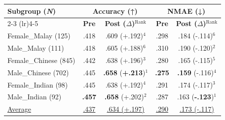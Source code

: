 \begin{tabular}{@{} p{2.8cm} | c c | c c @{}}
\toprule
\multirow{2}{*}{\textbf{Subgroup (\textbf{\textit{N}})}} & \multicolumn{2}{c|}{\textbf{Accuracy (↑)}} & \multicolumn{2}{c}{\textbf{NMAE (↓)}} \\
\cmidrule(lr){2-3} \cmidrule(lr){4-5}
& \textbf{Pre} & \textbf{Post ($\Delta$)}$^{\text{Rank}}$ & \textbf{Pre} & \textbf{Post ($\Delta$)}$^{\text{Rank}}$ \\
\midrule
Female\_Malay (125) & .418 & .609 (+.192)$^{4}$ & .298 & .184 (-.114)$^{6}$ \\
Male\_Malay (111) & .418 & .605 (+.188)$^{6}$ & .310 & .190 (-.120)$^{2}$ \\
Female\_Chinese (845) & .442 & .638 (+.196)$^{3}$ & .280 & .165 (-.115)$^{5}$ \\
Male\_Chinese (702) & .445 & \textbf{.658} (\textbf{+.213})$^{1}$ & \textbf{.275} & \textbf{.159} (-.116)$^{4}$ \\
Female\_Indian (98) & .445 & .638 (+.192)$^{4}$ & .291 & .174 (-.117)$^{3}$ \\
Male\_Indian (92) & \textbf{.457} & \textbf{.658} (+.202)$^{2}$ & .287 & .163 (\textbf{-.123})$^{1}$ \\
\midrule
\underline{Average} & \underline{.437} & \underline{.634 (+.197)} & \underline{.290} & \underline{.173 (-.117)} \\
\bottomrule
\end{tabular}
